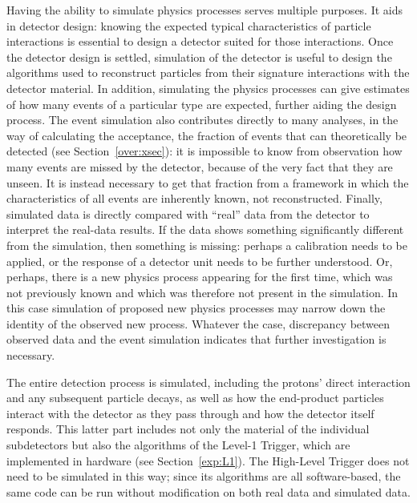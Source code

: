 Having the ability to simulate physics processes 
serves multiple purposes. 
It aids in detector design: 
knowing the expected typical characteristics of particle 
interactions is essential to design a detector 
suited for those interactions.  
Once the detector design is settled, 
simulation of the detector is useful to design 
the algorithms used to reconstruct particles 
from their signature interactions with the 
detector material.  
In addition, simulating the physics processes 
can give estimates of how many 
events of a particular type are expected, 
further aiding the design process.  
The event simulation also contributes 
directly to many analyses, 
in the way of calculating the acceptance, 
the fraction of events that can theoretically 
be detected (see Section~\ref{over:xsec}): 
it is impossible to know from observation 
how many events are missed by the detector, 
because of the very fact that they are unseen.  
It is instead necessary to get that fraction 
from a framework in which 
the characteristics of all events are 
inherently known, not reconstructed.  
Finally, %
simulated data is directly compared 
with ``real'' data from the detector 
to interpret the real-data results.  
If the data shows something significantly 
different from the simulation, 
then something is missing: 
perhaps a calibration needs to be applied, 
or the response of a detector unit needs 
to be further understood.  
Or, perhaps, there is a new physics process 
appearing for the first time, 
which was not previously known and 
which was therefore not present in the simulation.  
In this case simulation of proposed new physics 
processes may narrow down the identity of the 
observed new process.  
Whatever the case, 
discrepancy between observed data and the event 
simulation indicates that further 
investigation is necessary.  







The entire detection process is simulated, 
including the protons' direct interaction 
and any subsequent particle decays, 
as well as how the end-product particles 
interact with the detector as they pass through 
and how the detector itself responds.  
This latter part includes not only the 
material of the individual subdetectors 
but also the algorithms of 
the Level-1 Trigger, 
which are implemented in hardware 
(see Section~\ref{exp:L1}).  
The High-Level Trigger does not need to be 
simulated in this way; 
since its algorithms are all software-based, 
the same code can be run without modification 
on both real data and simulated data.  




